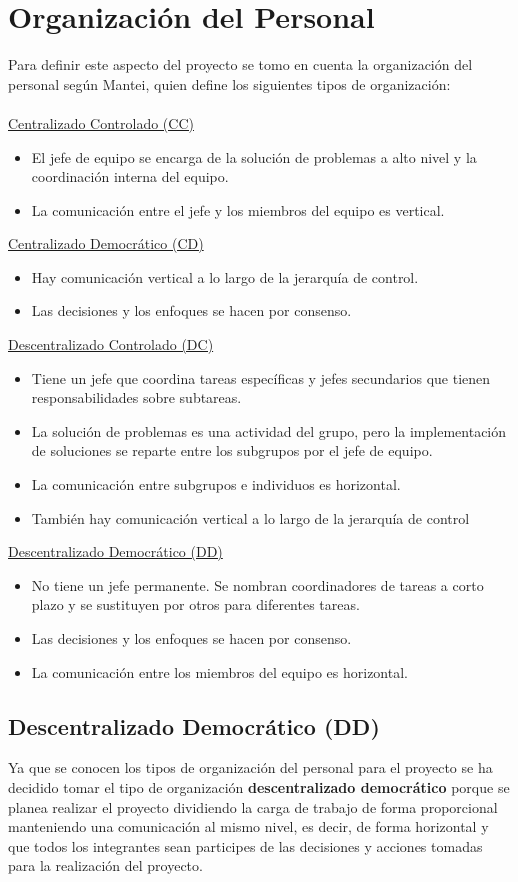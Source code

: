 \documentclass[10pt,executivepaper]{article}
\begin{document}
\section{Organización del Personal}
Para definir este aspecto del proyecto se tomo en cuenta la organización del personal según Mantei, quien define los siguientes tipos de organización:\\
\\\underline{Centralizado Controlado (CC)}
\begin{itemize}
    \item El jefe de equipo se encarga de la solución de problemas a alto nivel y la coordinación interna del equipo.
    \item La comunicación entre el jefe y los miembros del equipo es vertical.
\end{itemize}
\underline{Centralizado Democrático (CD)}
\begin{itemize}
    \item Hay comunicación vertical a lo largo de la jerarquía de control.
    \item Las decisiones y los enfoques se hacen por consenso.
\end{itemize}
\underline{Descentralizado Controlado (DC)}
\begin{itemize}
    \item Tiene un jefe que coordina tareas específicas y jefes secundarios que tienen responsabilidades sobre subtareas.
    \item La solución de problemas es una actividad del grupo, pero la implementación de soluciones se reparte entre los subgrupos por el jefe de equipo.
    \item La comunicación entre subgrupos e individuos es horizontal.
    \item También hay comunicación vertical a lo largo de la jerarquía de control
\end{itemize}
\underline{Descentralizado Democrático (DD)}
\begin{itemize}
    \item No tiene un jefe permanente. Se nombran coordinadores de tareas a corto plazo y se sustituyen por otros para diferentes tareas.
    \item Las decisiones y los enfoques se hacen por consenso.
    \item La comunicación entre los miembros del equipo es horizontal.
\end{itemize}
\subsection{Descentralizado Democrático (DD)}
Ya que se conocen los tipos de organización del personal para el proyecto se ha decidido tomar el tipo de organización \textbf{descentralizado democrático} porque se planea realizar el proyecto dividiendo la carga de trabajo de forma proporcional manteniendo una comunicación al mismo nivel, es decir, de forma horizontal y que todos los integrantes sean participes de las decisiones y acciones tomadas para la realización del proyecto.
\end{document}

